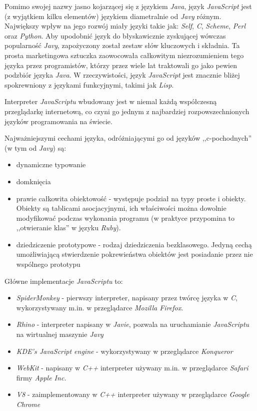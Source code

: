 \documentclass[11pt,twoside]{report}
\begin{document}
Pomimo swojej nazwy jasno kojarzącej się z językiem \emph{Java}, język
\emph{JavaScript} jest (z wyjątkiem kilku elementów) językiem
diametralnie od \emph{Javy} różnym. Największy wpływ na jego rozwój
miały języki takie jak: \emph{Self}, \emph{C}, \emph{Scheme},
\emph{Perl} oraz \emph{Python}. Aby upodobnić język do błyskawicznie
zyskującej wówczas popularność \emph{Javy}, zapożyczony został zestaw
słów kluczowych i składnia. Ta prosta marketingowa sztuczka
zaowocowała całkowitym niezrozumieniem tego języka przez programistów,
którzy przez wiele lat traktowali go jako pewien podzbiór języka
\emph{Java}. W rzeczywistości, język \emph{JavaScript} jest znacznie
bliżej spokrewniony z językami funkcyjnymi, takimi jak \emph{Lisp}.

Interpreter \emph{JavaScriptu} wbudowany jest w niemal każdą
współczesną przeglądarkę internetową, co czyni go jednym z najbardziej
rozpowszechnionych języków programowania na świecie.

Najważniejszymi cechami języka, odróżniającymi go od języków
,,c-pochodnych'' (w tym od \emph{Javy}) są:

\begin{itemize}
\item dynamiczne typowanie
\item domknięcia
\item prawie całkowita obiektowość - występuje podział na typy proste
  i obiekty. Obiekty są tablicami asocjacyjnymi, ich właściwości można
  dowolnie modyfikować podczas wykonania programu (w praktyce
  przypomina to ,,otwieranie klas'' w języku \emph{Ruby}).
\item dziedziczenie prototypowe - rodzaj dziedziczenia
  bezklasowego. Jedyną cechą umożliwiającą stwierdzenie pokrewieństwa
  obiektów jest posiadanie przez nie wspólnego prototypu
\end{itemize}

Główne implementacje \emph{JavaScriptu} to:

\begin{itemize}
\item \emph{SpiderMonkey} - pierwszy interpreter, napisany przez
  twórcę języka w \emph{C}, wykorzystywany m.in. w przeglądarce \emph{Mozilla
    Firefox}.
\item \emph{Rhino} - interpreter napisany w \emph{Javie}, pozwala na
  uruchamianie \emph{JavaScriptu} na wirtualnej maszynie \emph{Javy}
\item \emph{KDE's JavaScript engine} - wykorzystywany w przeglądarce
  \emph{Konqueror}
\item \emph{WebKit} - napisany w \emph{C++} interpreter używany
  m.in. w przeglądarce \emph{Safari} firmy \emph{Apple Inc.}
\item \emph{V8} - zaimplementowany w \emph{C++} interpreter używany w
  przeglądarce \emph{Google Chrome}
\end{itemize}
\end{document}
